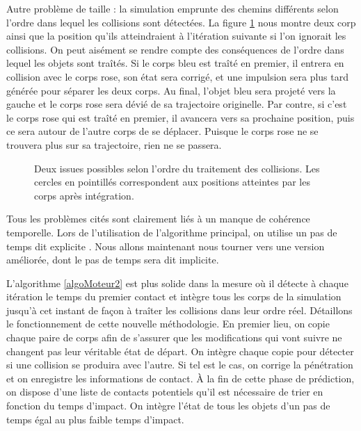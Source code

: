 Autre problème de taille : la simulation emprunte des chemins
différents selon l'ordre dans lequel les collisions sont détectées. La
figure \ref{ordre} nous montre deux corp ainsi que la position qu'ils
atteindraient à l'itération suivante si l'on ignorait les
collisions. On peut aisément se rendre compte des conséquences de
l'ordre dans lequel les objets sont traîtés. Si le corps bleu est
traîté en premier, il entrera en collision avec le corps rose, son
état sera corrigé, et une impulsion sera plus tard générée pour
séparer les deux corps. Au final, l'objet bleu sera projeté vers la
gauche et le corps rose sera dévié de sa trajectoire originelle. Par
contre, si c'est le corps rose qui est traîté en premier, il avancera
vers sa prochaine position, puis ce sera autour de l'autre corps de se
déplacer. Puisque le corps rose ne se trouvera plus sur sa
trajectoire, rien ne se passera.

\begin{figure}[h]
  \centering
  \subfloat{  }
  \caption{Deux issues possibles selon l'ordre du traitement des
    collisions. Les cercles en pointillés correspondent aux positions
    atteintes par les corps après intégration.}
  \label{ordre}
\end{figure}

Tous les problèmes cités sont clairement liés à un manque de cohérence
temporelle. Lors de l'utilisation de l'algorithme principal, on
utilise un pas de temps dit explicite \cite{garstenauer}. Nous allons
maintenant nous tourner vers une version améliorée, dont le pas de
temps sera dit implicite.

L'algorithme \ref{algoMoteur2} est plus solide dans la mesure o\`u il
détecte à chaque itération le temps du premier contact et intègre tous
les corps de la simulation jusqu'à cet instant de façon à traîter les
collisions dans leur ordre réel. Détaillons le fonctionnement de cette
nouvelle méthodologie. En premier lieu, on copie chaque paire de corps
afin de s'assurer que les modifications qui vont suivre ne changent
pas leur véritable état de départ. On intègre chaque copie pour
détecter si une collision se produira avec l'autre. Si tel est le cas,
on corrige la pénétration et on enregistre les informations de
contact. \`A la fin de cette phase de prédiction, on dispose d'une
liste de contacts potentiels qu'il est nécessaire de trier en fonction
du temps d'impact. On intègre l'état de tous les objets d'un pas de
temps égal au plus faible temps d'impact.

